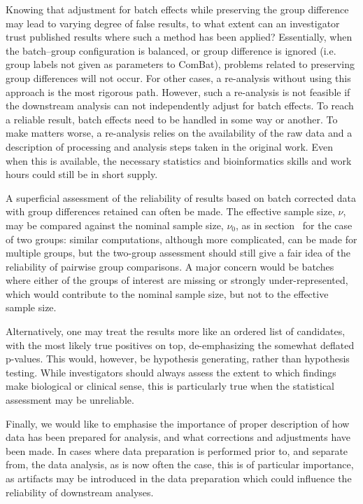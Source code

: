 \documentclass{bio}
\begin{document}
Knowing that adjustment for batch effects while preserving the group difference may lead to varying degree of false results, to what extent can an investigator trust published results where such a method has been applied? Essentially, when the batch--group configuration is balanced, or group difference is ignored  (i.e. group labels not given as parameters to ComBat), problems related to preserving group differences will not occur. For other cases, a re-analysis without using this approach is the most rigorous path. However, such a re-analysis is not feasible if the downstream  analysis can not independently adjust for batch effects. To reach a reliable result, batch effects need to be handled in some way or another. To make matters worse, a re-analysis relies on the availability of the raw data and a description of processing and analysis steps taken in the original work. Even when this is available, the necessary statistics and bioinformatics skills and work hours could still be in short supply.

A superficial assessment of the reliability of results based on batch corrected data with group differences retained can often be made. The effective sample size, $\nu$, may be compared against the nominal sample size, $\nu_0$, as in section~\label{sec:twogroups} for the case of two groups: similar computations, although more complicated, can be made for multiple groups, but the two-group assessment should still give a fair idea of the reliability of pairwise group comparisons. A major concern would be batches where either of the groups of interest are missing or strongly under-represented, which would contribute to the nominal sample size, but not to the effective sample size.

Alternatively, one may treat the results more like an ordered list of candidates, with the most likely true positives on top, de-emphasizing the somewhat deflated p-values. This would, however, be hypothesis generating, rather than hypothesis testing. While investigators should always assess the extent to which findings make biological or clinical sense, this is particularly true when the statistical assessment may be unreliable.

Finally, we would like to emphasise the importance of proper description of how data has been prepared for analysis, and what corrections and adjustments have been made. In cases where data preparation is performed prior to, and separate from, the data analysis, as is now often the case, this is of particular importance, as artifacts may be introduced in the data preparation which could influence the reliability of downstream analyses.
\end{document}
